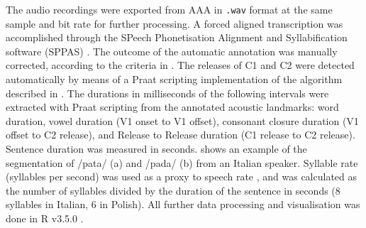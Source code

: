 \documentclass[preprint]{JASAnew}
\begin{document}

The audio recordings were exported from AAA in \texttt{.wav} format at
the same sample and bit rate for further processing. A forced aligned
transcription was accomplished through the SPeech Phonetisation
Alignment and Syllabification software (SPPAS) \citep{bigi2015}. The
outcome of the automatic annotation was manually corrected, according to
the criteria in . The releases of C1 and C2 were
detected automatically by means of a Praat scripting implementation of
the algorithm described in \citet{ananthapadmanabha2014}. The durations
in milliseconds of the following intervals were extracted with Praat
scripting from the annotated acoustic landmarks: word duration, vowel
duration (V1 onset to V1 offset), consonant closure duration (V1 offset
to C2 release), and Release to Release duration (C1 release to C2
release). Sentence duration was measured in seconds.
 shows an example of the segmentation of /pata/ (a)
and /pada/ (b) from an Italian speaker. Syllable rate (syllables per
second) was used as a proxy to speech rate \citep{plug2018}, and was
calculated as the number of syllables divided by the duration of the
sentence in seconds (8 syllables in Italian, 6 in Polish). All further
data processing and visualisation was done in R v3.5.0
\citep{r-core-team2018, wickham2017}.
\end{document}
